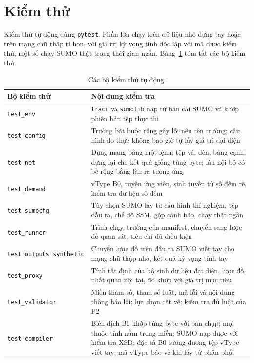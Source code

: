 \documentclass[../main.tex]{subfiles}
\begin{document}
\section{Kiểm thử}
\label{section:testing}

Kiểm thử tự động dùng \texttt{pytest}. Phần lớn chạy trên dữ liệu nhỏ dựng tay hoặc trên mạng chữ thập tí hon, với giá trị kỳ vọng tính độc lập với mã được kiểm thử; một số chạy SUMO thật trong thời gian ngắn. Bảng~\ref{table:4.5} tóm tắt các bộ kiểm thử.

\begin{table}[H]
\centering
\small
\caption{Các bộ kiểm thử tự động.} \label{table:4.5}
\begin{tabular}{|p{3.6cm}|p{9.4cm}|}
\hline
\textbf{Bộ kiểm thử} & \textbf{Nội dung kiểm tra} \\ \hline
\texttt{test\_env} & \texttt{traci} và \texttt{sumolib} nạp từ bản cài SUMO và khớp phiên bản tệp thực thi \\ \hline
\texttt{test\_config} & Trường bắt buộc rỗng gây lỗi nêu tên trường; cấu hình đo thực không bao giờ tự lấy giá trị đại diện \\ \hline
\texttt{test\_net} & Dựng mạng bằng một lệnh; tệp vá, đèn, bảng cạnh; dựng lại cho kết quả giống từng byte; làn nội bộ có bề rộng bằng làn ra tương ứng \\ \hline
\texttt{test\_demand} & vType B0, tuyến ứng viên, sinh tuyến từ số đếm rẽ, kiểm tra dữ liệu số đếm \\ \hline
\texttt{test\_sumocfg} & Tùy chọn SUMO lấy từ cấu hình thí nghiệm, tệp đầu ra, chế độ SSM, gộp cảnh báo, chạy thật ngắn \\ \hline
\texttt{test\_runner} & Trình chạy, trường của manifest, chuyển sang lược đồ quan sát, tiêu chí đủ điều kiện \\ \hline
\texttt{test\_outputs\_\allowbreak synthetic} & Chuyển lược đồ trên đầu ra SUMO viết tay cho mạng chữ thập nhỏ, kết quả kỳ vọng tính tay \\ \hline
\texttt{test\_proxy} & Tính tất định của bộ sinh dữ liệu đại diện, lược đồ, nhất quán nội tại, độ khớp với giá trị mục tiêu \\ \hline
\texttt{test\_validator} & Miền tham số, tham số luật, mã lỗi và nội dung thông báo lỗi; lựa chọn cắt về; kiểm tra đủ luật của P2 \\ \hline
\texttt{test\_compiler} & Biên dịch B1 khớp từng byte với bản chụp; mọi thuộc tính nằm trong miền; SUMO nạp được với kiểm tra XSD; đặc tả B0 tương đương tệp vType viết tay; mã vType báo về khi lấy từ phân phối \\ \hline

\end{tabular}
\end{table}
\end{document}
